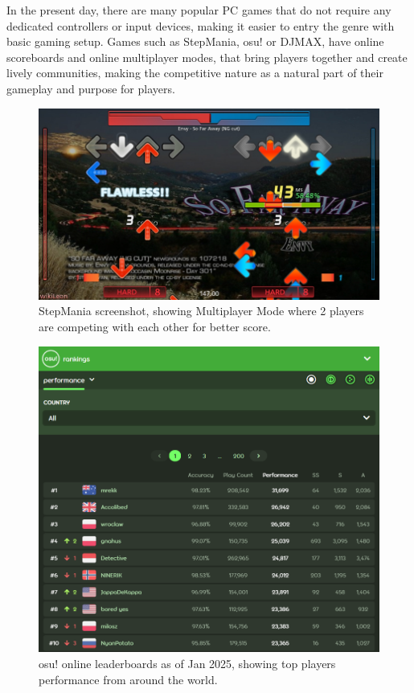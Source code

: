 In the present day, there are many popular PC games that do not require any dedicated controllers or input devices, making it easier to entry the genre with basic gaming setup. Games such as StepMania, osu! or DJMAX, have online scoreboards and online multiplayer modes, that bring players together and create lively communities, making the competitive nature as a natural part of their gameplay and purpose for players.

\begin{figure}[h]
    \centering\includegraphics[scale=0.4]{obrazki/sm5multi.jpg}
    \caption{StepMania screenshot, showing Multiplayer Mode where 2 players are competing with each other for better score. \cite{sm5multi}}
    \label{fig:sm5_multi}
\end{figure}
\pagebreak
\begin{figure}[h]
    \centering\includegraphics[scale=0.6]{obrazki/osuleaderboards.png}
    \caption{osu! online leaderboards as of Jan 2025, showing top players performance from around the world. \cite{osuleaderboards}}
    \label{fig:osu_leaderboards}
\end{figure}
 
